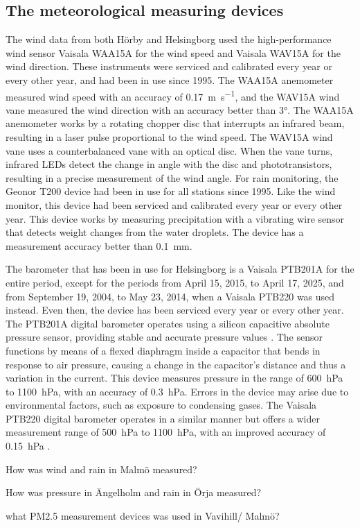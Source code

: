 \subsection{The meteorological measuring devices}
The wind data from both Hörby and Helsingborg used the high-performance wind sensor Vaisala WAA15A for the wind speed and Vaisala WAV15A for the wind direction. These instruments were serviced and calibrated every year or every other year, and had been in use since 1995. The WAA15A anemometer measured wind speed with an accuracy of \SI{0.17}{\m\per\s}, and the WAV15A wind vane measured the wind direction with an accuracy better than \ang{3}\cite{vaisalaWindSetWA152021}. The WAA15A anemometer works by a rotating chopper disc that interrupts an infrared beam, resulting in a laser pulse proportional to the wind speed. The WAV15A wind vane uses a counterbalanced vane with an optical disc. When the vane turns, infrared LEDs detect the change in angle with the disc and phototransistors, resulting in a precise measurement of the wind angle. For rain monitoring, the Geonor T200 device had been in use for all stations since 1995. Like the wind monitor, this device had been serviced and calibrated every year or every other year. This device works by measuring precipitation with a vibrating wire sensor that detects weight changes from the water droplets\cite{geonorinc.T200BSeriesAll2019}. The device has a measurement accuracy better than \SI{0.1}{\mm}.

The barometer that has been in use for Helsingborg is a Vaisala PTB201A for the entire period, except for the periods from April 15, 2015, to April 17, 2025, and from September 19, 2004, to May 23, 2014, when a Vaisala PTB220 was used instead. Even then, the device has been serviced every year or every other year. The PTB201A digital barometer operates using a silicon capacitive absolute pressure sensor, providing stable and accurate pressure values \cite{vaisalaPTB200DIGITAL1993}. The sensor functions by means of a flexed diaphragm inside a capacitor that bends in response to air pressure, causing a change in the capacitor’s distance and thus a variation in the current. This device measures pressure in the range of \SI{600}{\hecto\pascal} to \SI{1100}{\hecto\pascal}, with an accuracy of \SI{0.3}{\hecto\pascal}. Errors in the device may arise due to environmental factors, such as exposure to condensing gases. The Vaisala PTB220 digital barometer operates in a similar manner but offers a wider measurement range of \SI{500}{\hecto\pascal} to \SI{1100}{\hecto\pascal}, with an improved accuracy of \SI{0.15}{\hecto\pascal} \cite{vaisalaPTB220SeriesDigital2001}.


How was wind and rain in Malmö measured? 

How was pressure in Ängelholm  and rain in Örja measured? 

what PM2.5 measurement devices was used in Vavihill/ Malmö? 